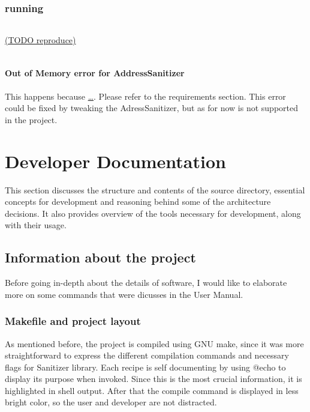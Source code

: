 \documentclass{elteikthesis}[2018/06/06]
\begin{document}
\subsection{running}
\label{sec-2-5-2}
\begin{center}
\begin{tabular}{}
\\
\end{tabular}
\end{center}
\uline{(TODO reproduce)} \\
\begin{center}
\begin{tabular}{}
\\
\end{tabular}
\end{center}
\subsubsection{Out of Memory error for AddressSanitizer}
\label{sec-2-5-2-1}
This happens because \uline{\ldots{}}. Please refer to the requirements section. This error could be fixed by tweaking the AdressSanitizer, but as for now is not supported in the project. \\
\chapter{Developer Documentation}
\label{sec-3}
This section discusses the structure and contents of the source directory, essential concepts for development and reasoning behind some of the architecture decisions. It also provides overview of the tools necessary for development, along with their usage. \\
\section{Information about the project}
\label{sec-3-1}
Before going in-depth about the details of software, I would like to elaborate more on some commands that were dicusses in the User Manual. \\
\subsection{Makefile and project layout}
\label{sec-3-1-1}
As mentioned before, the project is compiled using GNU make, since it was more straightforward to express the different compilation commands and necessary flags for Sanitizer library. Each recipe is self documenting by using @echo to display its purpose when invoked. Since this is the most crucial information, it is highlighted in shell output. After that the compile command is displayed in less bright color, so the user and developer are not distracted. \\
\end{document}
